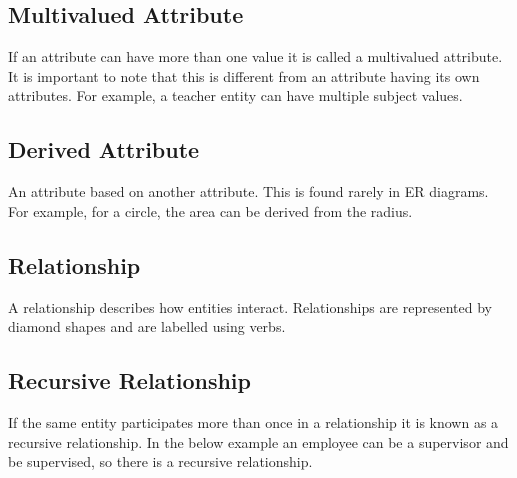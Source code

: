 \documentclass[12pt,a4paper]{report}
\begin{document}
\subsection{Multivalued Attribute}
If an attribute can have more than one value it is called a multivalued attribute. It is important to note that this is different from an attribute having its own attributes. For example, a teacher entity can have multiple subject values.

\subsection{Derived Attribute}
An attribute based on another attribute. This is found rarely in ER diagrams. For example, for a circle, the area can be derived from the radius.

\subsection{Relationship}
A relationship describes how entities interact. Relationships are represented by diamond shapes and are labelled using verbs.

\subsection{Recursive Relationship}
If the same entity participates more than once in a relationship it is known as a recursive relationship. In the below example an employee can be a supervisor and be supervised, so there is a recursive relationship.
\end{document}
